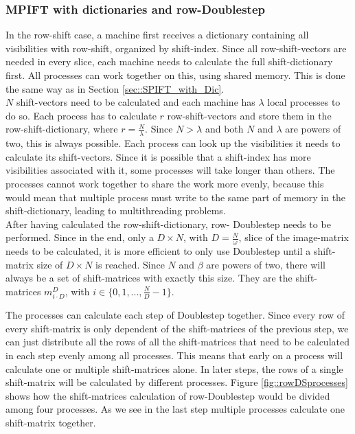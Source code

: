 \documentclass[12pt]{article}
\begin{document}
\subsubsection{MPIFT with dictionaries and row-Doublestep}
\label{sec::parallelDoublestep}

In the row-shift case, a machine first receives a dictionary containing all visibilities with row-shift, organized by shift-index.
Since all row-shift-vectors are needed in every slice, each machine needs to calculate the full shift-dictionary first. All processes can work together on this, using shared memory.
This is done the same way as in Section \ref{sec::SPIFT_with_Dic}.\\

$N$ shift-vectors need to be calculated and each machine has $\lambda$ local processes to do so. Each process has to calculate $r$ row-shift-vectors and store them in the row-shift-dictionary, where $r=\frac{N}{\lambda}$. Since $N>\lambda$ and both $N$ and $\lambda$ are powers of two, this is always possible. Each process can look up the visibilities it needs to calculate its shift-vectors. Since it is possible that a shift-index has more visibilities associated with it, some processes will take longer than others. The processes cannot work together to share the work more evenly, because this would mean that multiple process must write to the same part of memory in the shift-dictionary, leading to multithreading problems.\\


After having calculated the row-shift-dictionary, row- Doublestep needs to be performed. Since in the end, only a $D\times N$, with $D=\frac{N}{\omega}$, slice of the image-matrix needs to be calculated, it is more efficient to only use Doublestep until a shift-matrix size of $D\times N$ is reached. Since $N$ and $\beta$ are powers of two, there will always be a set of shift-matrices with exactly this size. They are the shift-matrices $m_{i\cdot D}^{D}$, with $i\in \{0,1,...,\frac{N}{D}-1 \}$.

The processes can calculate each step of Doublestep together. Since every row of every shift-matrix is only dependent of the shift-matrices of the previous step, we can just distribute all the rows of all the shift-matrices that need to be calculated in each step evenly among all processes. This means that early on a process will calculate one or multiple shift-matrices alone. In later steps, the rows of a single shift-matrix will be calculated by different processes. Figure \ref{fig::rowDSprocesses} shows how the shift-matrices calculation of row-Doublestep would be divided among four processes. As we see in the last step multiple processes calculate one shift-matrix together. \\
 
\end{document}
